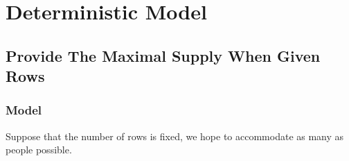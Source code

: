 \section{Deterministic Model}

\subsection{Provide The Maximal Supply When Given Rows}\label{maximal_supply}

\subsubsection{Model}
Suppose that the number of rows is fixed, we hope to accommodate as many as people possible. 






